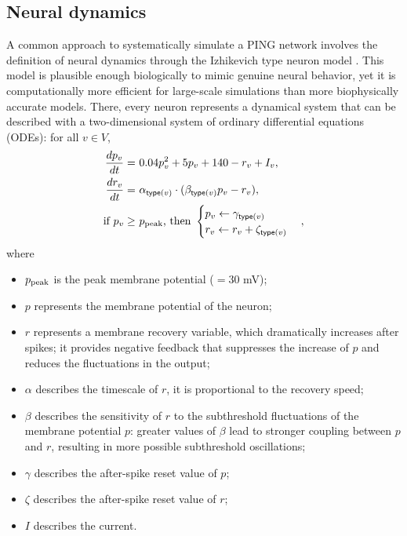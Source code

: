 \subsection{Neural dynamics}
\label{sec:neural-dynamics}

A common approach to systematically simulate a PING network involves the definition of neural dynamics through the Izhikevich type neuron model  \cite{Izhikevich2003}. This model is plausible enough biologically to mimic genuine neural behavior, yet it is computationally more efficient for large-scale simulations than more biophysically accurate models. There, every neuron represents a dynamical system that can be described with a two-dimensional system of ordinary differential equations (ODEs): for all $v \in V$,
\begin{align}
    \frac{dp_v}{dt} =\ & 0.04 p_v^2 + 5p_v + 140 - r_v + I_v,
    \label{eq:Izhikevich-model-dp-dt} \\
    \frac{dr_v}{dt} =\ & \alpha_{\mathsf{type}(v)} \cdot (\beta_{\mathsf{type}(v)} p_v - r_v), \label{eq:Izhikevich-model-dr-dt} \\
    \text{if } p_v \geq\ & p_{\mathrm{peak}} \text{, then } 
    \begin{cases}
        p_v \leftarrow \gamma_{\mathsf{type}(v)} \\
        r_v \leftarrow r_v + \zeta_{\mathsf{type}(v)}
    \end{cases}, 
    \label{eq:Izhikevich-model-p30}
\end{align}
where
\begin{itemize}
    \item $p_{\mathrm{peak}}$ is the peak membrane potential ($= 30$ mV);
    
    \item $p$ represents the membrane potential of the neuron; 
    
    \item $r$ represents a membrane recovery variable, which dramatically increases after spikes; it provides negative feedback that suppresses the increase of $p$ and reduces the fluctuations in the output;
    
    \item $\alpha$ describes the timescale of $r$, it is proportional to the recovery speed;
    
    \item $\beta$ describes the sensitivity of $r$ to the subthreshold fluctuations of the membrane potential $p$: greater values of $\beta$ lead to stronger coupling between $p$ and $r$, resulting in more possible subthreshold oscillations;
    
    \item $\gamma$ describes the after-spike reset value of $p$;
    
    \item $\zeta$ describes the after-spike reset value of $r$;
    
    \item $I$ describes the current.
\end{itemize}

